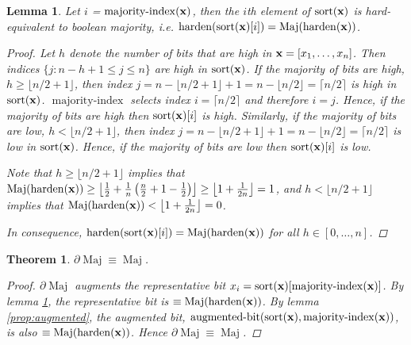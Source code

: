 \documentclass{article} %
\newtheorem{theorem}{Theorem}
\newtheorem{lemma}{Lemma}
\begin{document}
\begin{lemma}
\label{lem:maj}
Let $i$ = $\operatorname{majority-index}({\bf x})$, then the $i$th element of $\operatorname{sort}({\bf x})$ is hard-equivalent to boolean majority, i.e. $\operatorname{harden}(\operatorname{sort}({\bf x})[i]) = \operatorname{Maj}(\operatorname{harden}({\bf x}))$.
\begin{proof}
Let $h$ denote the number of bits that are high in ${\bf x} = [x_{1}, \dots, x_{n}]$. Then indices $\{j : n-h+1 \leq j \leq n\}$ are high in $\operatorname{sort}({\bf x})$. If the majority of bits are high, $h \geq \lfloor n/2 + 1 \rfloor$, then index $j=n - \lfloor n/2 + 1 \rfloor + 1 = n - \lfloor n/2 \rfloor = \lceil n/2 \rceil$ is high in $\operatorname{sort}({\bf x})$. $\operatorname{majority-index}$ selects index $i = \lceil n/2 \rceil$ and therefore $i=j$. Hence, if the majority of bits are high then $\operatorname{sort}({\bf x})[i]$ is high. Similarly, if the majority of bits are low, $h < \lfloor n/2 + 1 \rfloor$, then index $j=n - \lfloor n/2 + 1 \rfloor + 1 = n - \lfloor n/2 \rfloor = \lceil n/2 \rceil$ is low in $\operatorname{sort}({\bf x})$. Hence, if the majority of bits are low then $\operatorname{sort}({\bf x})[i]$ is low.

Note that $h \geq \lfloor n/2 + 1 \rfloor$ implies that $\operatorname{Maj}(\operatorname{harden}({\bf x})) \geq \left\lfloor \frac{1}{2} + \frac{1}{n}\left(\frac{n}{2} + 1 - \frac{1}{2} \right) \right\rfloor \geq \left\lfloor 1 + \frac{1}{2n} \right\rfloor = 1$, and $h < \lfloor n/2 + 1 \rfloor$ implies that $\operatorname{Maj}(\operatorname{harden}({\bf x})) < \left\lfloor 1 + \frac{1}{2n} \right\rfloor = 0$.

In consequence, $\operatorname{harden}(\operatorname{sort}({\bf x})[i]) = \operatorname{Maj}(\operatorname{harden}({\bf x}))$ for all $h \in [0,\dots, n]$.
\end{proof}
\end{lemma}

\begin{theorem}\label{prop:majority}
	$\partial\!\operatorname{Maj} \equiv \operatorname{Maj}$.
\begin{proof}
	$\partial\!\operatorname{Maj}$ augments the representative bit $x_{i} = \operatorname{sort}({\bf x})[\operatorname{majority-index}({\bf x})]$. By lemma \ref{lem:maj}, the representative bit is $\equiv \operatorname{Maj}(\operatorname{harden}({\bf x}))$.
    By lemma \ref{prop:augmented}, the augmented bit, $\operatorname{augmented-bit}(\operatorname{sort}({\bf x}), \operatorname{majority-index}({\bf x}))$, is also $\equiv \operatorname{Maj}(\operatorname{harden}({\bf x}))$. Hence $\partial\!\operatorname{Maj} \equiv \operatorname{Maj}$.
\end{proof}
\end{theorem}
\end{document}

